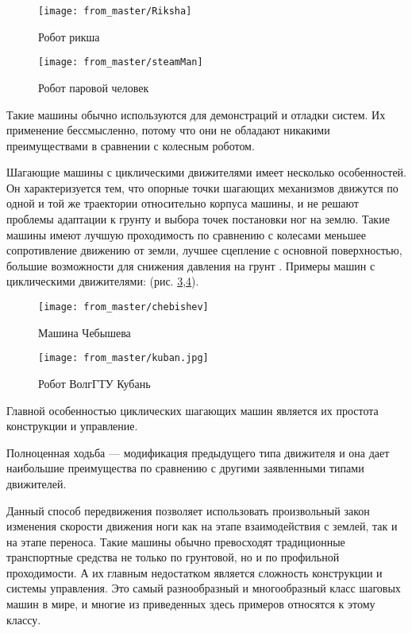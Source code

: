 \begin{figure}[H]
\centering\texttt{[image: from\_master/Riksha]}
\caption{Робот рикша}
\label{fig:Riksha}
\end{figure}

\begin{figure}[H]
\centering\texttt{[image: from\_master/steamMan]}
\caption{Робот паровой человек}
\label{fig:steamMan}
\end{figure}

Такие машины обычно используются для демонстраций и отладки систем. Их применение бессмысленно, потому что они не обладают никакими преимуществами в сравнении с колесным роботом. 

Шагающие машины с циклическими движителями имеет несколько особенностей. Он характеризуется тем, что опорные точки шагающих механизмов движутся по одной и той же траектории относительно корпуса машины, и не решают проблемы адаптации к грунту и выбора точек постановки ног на землю. Такие машины имеют лучшую проходимость по сравнению с колесами меньшее сопротивление движению от земли, лучшее сцепление с основной поверхностью, большие возможности для снижения давления на грунт \cite{cruse2001control}. Примеры машин с циклическими движителями: (рис. \ref{fig:chebishev},\ref{fig:kuban}).

\begin{figure}[H]
\centering\texttt{[image: from\_master/chebishev]}
\caption{Машина Чебышева}
\label{fig:chebishev}
\end{figure}

\begin{figure}[H]
\centering\texttt{[image: from\_master/kuban.jpg]}
\caption{Робот ВолгГТУ Кубань}
\label{fig:kuban}
\end{figure}

Главной особенностью циклических шагающих машин является их простота конструкции и управление. 

Полноценная ходьба --- модификация предыдущего типа движителя и она дает наибольшие преимущества по сравнению с другими заявленными типами движителей. 

Данный способ передвижения позволяет использовать произвольный закон изменения скорости движения ноги как на этапе взаимодействия с землей, так и на этапе переноса. Такие машины обычно превосходят традиционные транспортные средства не только по грунтовой, но и по профильной проходимости. А их главным недостатком является сложность конструкции и системы управления. Это самый разнообразный и многообразный класс шаговых машин в мире, и многие из приведенных здесь примеров относятся к этому классу. 

